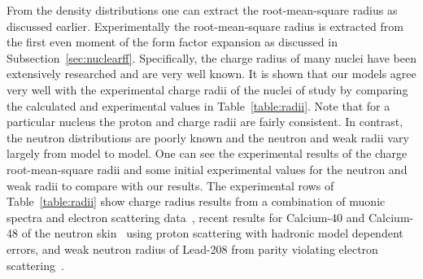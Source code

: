 From the density distributions one can extract the root-mean-square radius as discussed earlier. Experimentally the root-mean-square radius is extracted from the first even moment of the form factor expansion as discussed in Subsection~\ref{sec:nuclearff}. Specifically, the charge radius of many nuclei have been extensively researched and are very well known. It is shown that our models agree very well with the experimental charge radii of the nuclei of study by comparing the calculated and experimental values in Table~\ref{table:radii}. Note that for a particular nucleus the proton and charge radii are fairly consistent. In contrast, the neutron distributions are poorly known and the neutron and weak radii vary largely from model to model. One can see the experimental results of the charge root-mean-square radii and some initial experimental values for the neutron and weak radii to compare with our results. The experimental rows of Table~\ref{table:radii} show charge radius results from a combination of muonic spectra and electron scattering data~\cite{angeli:2013:table}, recent results for Calcium-40 and Calcium-48 of the neutron skin~\cite{zenihiro:2018:direct} using proton scattering with hadronic model dependent errors, and weak neutron radius of Lead-208 from parity violating electron scattering~\cite{PREX:2012:measurementPb}. 
\def\arraystretch{1.1}
\setlength\LTleft{0pt}
\setlength\LTright{0pt}
